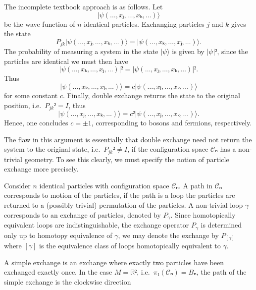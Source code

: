 \begin{example}\label{ex:crude exchange}
  The incomplete textbook approach is as follows. Let
  \begin{equation}
    |ψ(…,xⱼ,…,xₖ,…)⟩
  \end{equation}
  be the wave function of $n$ identical particles. Exchanging particles $j$ and $k$ gives the state
  \begin{equation}
    P_{jk} |ψ(…,xⱼ,…,xₖ,…)⟩ = |ψ(…,xₖ,…,xⱼ,…)⟩.
  \end{equation}
  The probability of measuring a system in the state $|ψ⟩$ is given by $|ψ|²$, since the particles are identical we must then have
  \begin{equation}
    |ψ(…,xₖ,…,xⱼ,…)|² = |ψ(…,xⱼ,…,xₖ,…)|².
  \end{equation}
  Thus
  \begin{equation}
    |ψ(…,xₖ,…,xⱼ,…)⟩ = c |ψ(…,xⱼ,…,xₖ,…)⟩
  \end{equation}
  for some constant $c$. Finally, double exchange returns the state to the original position, i.e.\ $P_{jk}² = I$, thus
  \begin{equation}
    |ψ(…,xⱼ,…,xₖ,…)⟩ = c² |ψ(…,xⱼ,…,xₖ,…)⟩.
  \end{equation}
  Hence, one concludes $c = ±1$, corresponding to bosons and fermions, respectively.
\end{example}

The flaw in this argument is essentially that double exchange need not return the system to the original state, i.e.\ $P_{jk}² ≠ I$, if the configuration space $𝒞ₙ$ has a non-trivial geometry. To see this clearly, we must specify the notion of particle exchange more precisely.

\begin{definition}[Exchange]
  Consider $n$ identical particles with configuration space $𝒞ₙ$. A path in $𝒞ₙ$ corresponds to motion of the particles, if the path is a loop the particles are returned to a (possibly trivial) permutation of the particles. A non-trivial loop $γ$ corresponds to an exchange of particles, denoted by $P_γ$. Since homotopically equivalent loops are indistinguishable, the exchange operator $P_γ$ is determined only up to homotopy equivalence of $γ$, we may denote the exchange by $P_{[γ]}$ where $[γ]$ is the equivalence class of loops homotopically equivalent to $γ$.
\end{definition}

\begin{definition}
  A simple exchange is an exchange where exactly two particles have been exchanged exactly once. In the case $M=ℝ²$, i.e.\ $π₁(𝒞ₙ) = Bₙ$, the path of the simple exchange is the clockwise direction
\end{definition}

